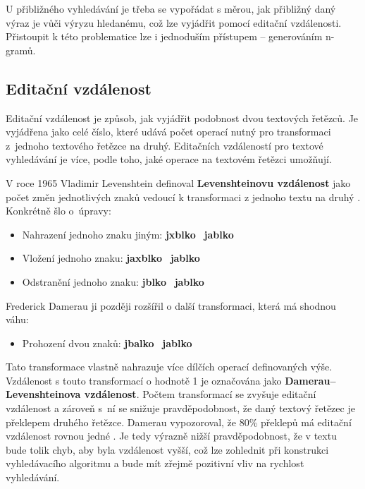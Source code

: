 \documentclass[FM,DP]{tulthesis}
\begin{document}
U přibližného vyhledávání je třeba se vypořádat s měrou, jak přibližný daný výraz
je vůči výryzu hledanému, což lze vyjádřit pomocí editační vzdálenosti. Přistoupit
k této problematice lze i jednoduším přístupem -- generováním n-gramů.

\subsection{Editační vzdálenost}

Editační vzdálenost je způsob, jak vyjádřit podobnost dvou textových řetězců. Je
vyjádřena jako celé číslo, které udává počet operací nutný pro transformaci z~jednoho
textového řetězce na druhý. Editačních vzdáleností pro textové vyhledávání je více, 
podle toho, jaké operace na textovém řetězci umožňují.

V roce 1965 Vladimir Levenshtein definoval \textbf{Levenshteinovu vzdálenost} jako počet
změn jednotlivých znaků vedoucí k transformaci z jednoho textu na druhý \cite{es-fuzziness}. 
Konkrétně šlo o~úpravy:

\begin{itemize}
\item Nahrazení jednoho znaku jiným: \textbf{jxblko} \textrightarrow ~\textbf{jablko}
\item Vložení jednoho znaku: \textbf{jaxblko} \textrightarrow ~\textbf{jablko}
\item Odstranění jednoho znaku: \textbf{jblko} \textrightarrow ~\textbf{jablko}
\end{itemize}

Frederick Damerau ji později rozšířil o další transformaci, která má shodnou váhu:

\begin{itemize}
\item Prohození dvou znaků: \textbf{jbalko} \textrightarrow ~\textbf{jablko}
\end{itemize}

Tato transformace vlastně nahrazuje více dílčích operací definovaných výše. 
Vzdálenost s touto transformací o hodnotě 1 je označována jako 
\textbf{Damerau–Levenshteinova vzdálenost}. 
Počtem transformací se zvyšuje editační vzdálenost a zároveň
s~ní se snižuje pravděpodobnost, že daný textový řetězec je překlepem
druhého řetězce. Damerau vypozoroval, že 80\% překlepů má editační vzdálenost 
rovnou jedné \cite{damerau}. Je tedy výrazně nižší pravděpodobnost, že 
v textu bude tolik chyb, aby byla vzdálenost vyšší, což lze zohlednit při konstrukci
vyhledávacího algoritmu a bude mít zřejmě pozitivní vliv na rychlost vyhledávání.
\end{document}
